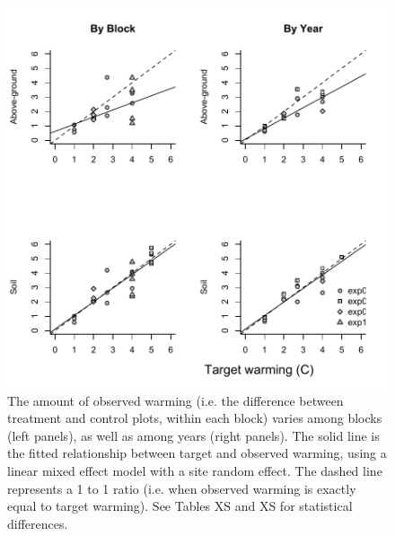 \documentclass{article}
\begin{document}
 \begin{figure}[p]
   \centering
 \includegraphics{../Analyses/figures/blockyearvar.pdf}  
 \caption{The amount of observed warming (i.e. the difference between treatment and control plots, within each block) varies among blocks (left panels), as well as among years (right panels). The solid line is the fitted relationship between target and observed warming, using a linear mixed effect model with a site random effect. The dashed line represents a 1 to 1 ratio (i.e. when observed warming is exactly equal to target warming). See Tables XS and XS for statistical differences. }%
 \label{fig:blockyear}

 \end{figure}
\clearpage
\end{document}
